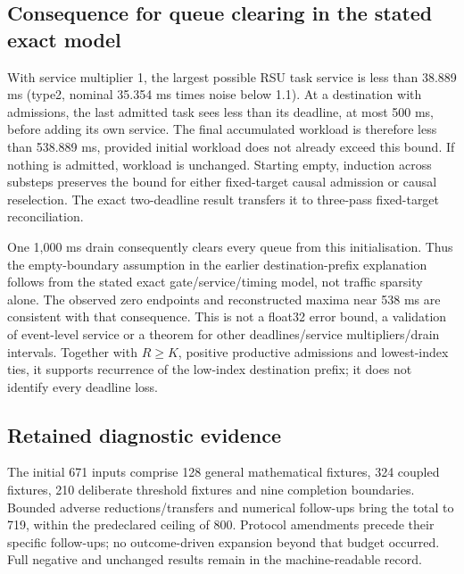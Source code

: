 \documentclass[11pt,a4paper]{article}
\begin{document}
\subsection{Consequence for queue clearing in the stated exact model}\label{sec:C.5}

With service multiplier 1, the largest possible RSU task service is less than 38.889 ms (type2, nominal 35.354 ms times noise below 1.1). At a destination with admissions, the last admitted task sees less than its deadline, at most 500 ms, before adding its own service. The final accumulated workload is therefore less than 538.889 ms, provided initial workload does not already exceed this bound. If nothing is admitted, workload is unchanged. Starting empty, induction across substeps preserves the bound for either fixed-target causal admission or causal reselection. The exact two-deadline result transfers it to three-pass fixed-target reconciliation.

One 1,000 ms drain consequently clears every queue from this initialisation. Thus the empty-boundary assumption in the earlier destination-prefix explanation follows from the stated exact gate/service/timing model, not traffic sparsity alone. The observed zero endpoints and reconstructed maxima near 538 ms are consistent with that consequence. This is not a float32 error bound, a validation of event-level service or a theorem for other deadlines/service multipliers/drain intervals. Together with $R\geq K$, positive productive admissions and lowest-index ties, it supports recurrence of the low-index destination prefix; it does not identify every deadline loss.

\subsection{Retained diagnostic evidence}\label{sec:C.6}

The initial 671 inputs comprise 128 general mathematical fixtures, 324 coupled fixtures, 210 deliberate threshold fixtures and nine completion boundaries. Bounded adverse reductions/transfers and numerical follow-ups bring the total to 719, within the predeclared ceiling of 800. Protocol amendments precede their specific follow-ups; no outcome-driven expansion beyond that budget occurred. Full negative and unchanged results remain in the machine-readable record.
\end{document}
